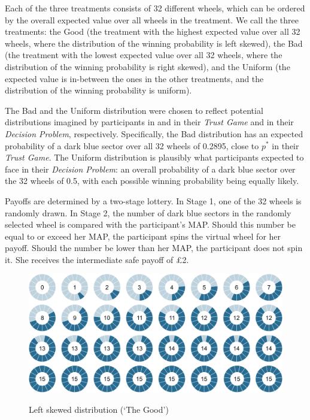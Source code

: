Each of the three treatments consists of 32 different wheels, which can be ordered by the overall expected value over all wheels in the treatment.
We call the three treatments: the Good (the treatment with the highest expected value over all 32 wheels, where the distribution of the winning probability is left skewed), the Bad (the treatment with the lowest expected value over all 32 wheels, where the distribution of the winning probability is right skewed), and the Uniform (the expected value is in-between the ones in the other treatments, and the distribution of the winning probability is uniform).

The Bad and the Uniform distribution were chosen to reflect potential distributions imagined by participants in \cite{Bohnet2004} and \cite{Bohnet2008} in their \textit{Trust Game} and in their \textit{Decision Problem}, respectively.
Specifically, the Bad distribution has an expected probability of a dark blue sector over all 32 wheels of 0.2895, close to $p^*$ in their \textit{Trust Game}.
The Uniform distribution is plausibly what participants expected to face in their \textit{Decision Problem}: an overall probability of a dark blue sector over the 32 wheels of 0.5, with each possible winning probability being equally likely.

Payoffs are determined by a two-stage lottery.
In Stage 1, one of the 32 wheels is randomly drawn.
In Stage 2, the number of dark blue sectors in the randomly selected wheel is compared with the participant's MAP.
Should this number be equal to or exceed her MAP, the participant spins the virtual wheel for her payoff.
Should the number be lower than her MAP, the participant does not spin it.
She receives the intermediate safe payoff of \pounds2.

\begin{figure}[h!]
  \centering
 {\includegraphics[width=0.95\linewidth]{Left_15.png}}
  \caption{Left skewed distribution (`The Good')}
  \label{fig:thegood}
\end{figure}


